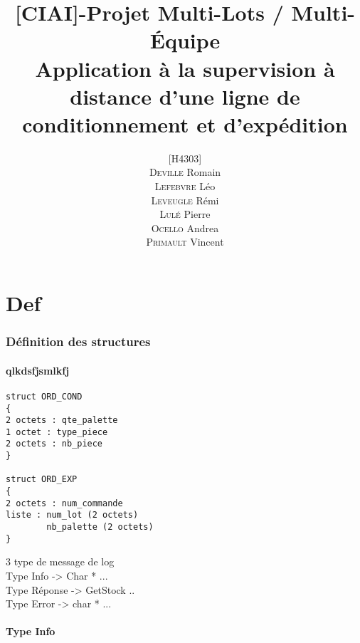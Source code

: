 \title{[CIAI]-Projet Multi-Lots / Multi-\'Equipe \\ \normalsize{Application \`a la supervision \`a distance d'une ligne de conditionnement et d'exp\'edition}}
\author{[H4303] \\ \textsc{Deville} Romain \\ \textsc{Lefebvre} L\'eo \\ \textsc{Leveugle} R\'emi \\ \textsc{Lul\'e} Pierre \\ \textsc{Ocello} Andrea \\ \textsc{Primault} Vincent}





\maketitle
\clearpage
\newpage
\tableofcontents
\newpage

\part{Def}
\section{Définition des structures}
\subsection{qlkdsfjsmlkfj}
\lstset{
	language=C
	} 
\begin{lstlisting}
struct ORD_COND
{
2 octets : qte_palette
1 octet : type_piece
2 octets : nb_piece
}

struct ORD_EXP
{
2 octets : num_commande
liste : num_lot (2 octets)
        nb_palette (2 octets)
}
\end{lstlisting}
\newpage

3 type de message de log \\
Type Info -> Char * ...\\
Type Réponse -> GetStock ..\\
Type Error -> char * ...\\

\subsection{Type Info}



